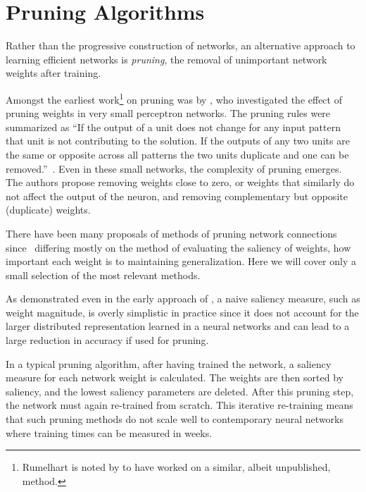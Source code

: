 \documentclass[thesis]{subfiles}
\begin{document}
	\section{Pruning Algorithms}
	Rather than the progressive construction of networks, an alternative approach to learning efficient networks is \emph{pruning}, the removal of unimportant network weights after training.

	Amongst the earliest work\footnote{Rumelhart is noted by \citet{hanson1989comparing} to have worked on a similar, albeit unpublished, method.} on pruning was by \citeauthor{sietsma1988neural}, who investigated the effect of pruning weights in very small perceptron networks. The pruning rules were summarized as ``If the output of a unit does not change for any input pattern that unit is not contributing to the solution. If the outputs of any two units are the same or opposite across all patterns the two units duplicate and one can be removed.''~\citep{sietsma1988neural}. Even in these small networks, the complexity of pruning emerges. The authors propose removing weights close to zero, or weights that similarly do not affect the output of the neuron, and removing complementary but opposite (\ie{}duplicate) weights. %
	
	There have been many proposals of methods of pruning network connections since~\citep{hanson1989comparing, lecun1989optimal, mozer1989using, mozer1989skeletonization, gorodkin1993quantitative, setiono1997penalty,castellano1997iterative,han2015learning,han2015deep,han2016dsd,ullrich2017soft,} differing mostly on the method of evaluating the saliency of weights, \ie how important each weight is to maintaining generalization.  Here we will cover only a small selection of the most relevant methods.
	
	As demonstrated even in the early approach of \citeauthor{sietsma1988neural}, a naive saliency measure, such as weight magnitude, is overly simplistic in practice since it does not account for the larger distributed representation learned in a neural networks and can lead to a large reduction in accuracy if used for pruning.

    In a typical pruning algorithm, after having trained the network, a saliency measure for each network weight is calculated. The weights are then sorted by saliency, and the lowest saliency parameters are deleted. After this pruning step, the network must again re-trained from scratch. This iterative re-training means that such pruning methods do not scale well to contemporary neural networks where training times can be measured in weeks.
\end{document}
